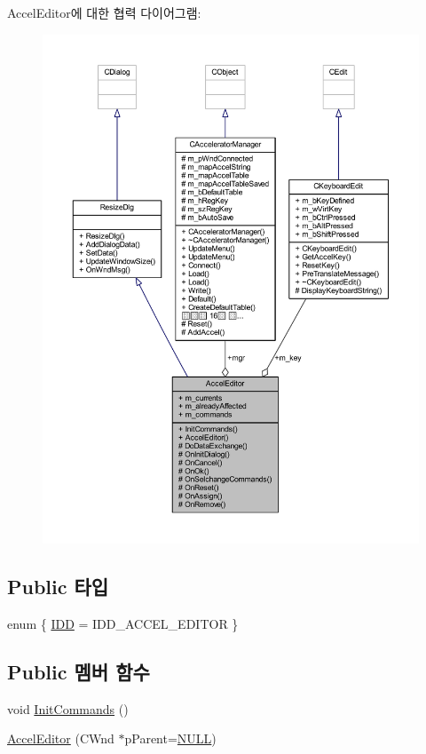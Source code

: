 Accel\+Editor에 대한 협력 다이어그램\+:\nopagebreak
\begin{figure}[H]
\begin{center}
\leavevmode
\includegraphics[width=350pt]{class_accel_editor__coll__graph}
\end{center}
\end{figure}
\subsection*{Public 타입}
\begin{DoxyCompactItemize}
\item 
enum \{ \mbox{\hyperlink{class_accel_editor_a2c120196c6edcc4e45a1eb6321060cf7a3ed38c6627e19d20129d5a6eee67408c}{I\+DD}} = I\+D\+D\+\_\+\+A\+C\+C\+E\+L\+\_\+\+E\+D\+I\+T\+OR
 \}
\end{DoxyCompactItemize}
\subsection*{Public 멤버 함수}
\begin{DoxyCompactItemize}
\item 
void \mbox{\hyperlink{class_accel_editor_a3c882fb85c72711e26cfe800fb11ccfa}{Init\+Commands}} ()
\item 
\mbox{\hyperlink{class_accel_editor_a4f3eb3bfb01a597da630a3144687f1ec}{Accel\+Editor}} (C\+Wnd $\ast$p\+Parent=\mbox{\hyperlink{_system_8h_a070d2ce7b6bb7e5c05602aa8c308d0c4}{N\+U\+LL}})
\end{DoxyCompactItemize}
